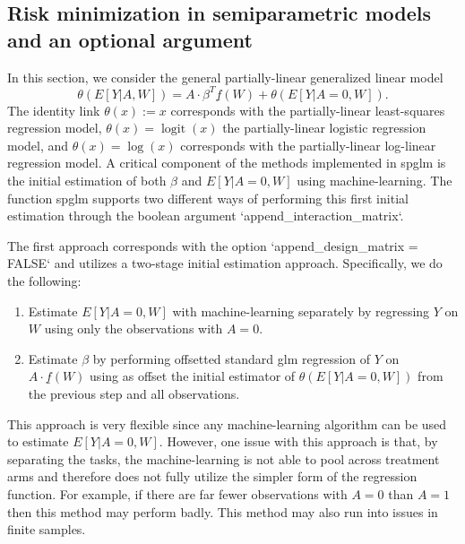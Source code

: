 \documentclass[article]{jss}
\DeclareMathOperator{\logit}{logit}
\begin{document}
\subsection{Risk minimization in semiparametric models and an optional argument }
In this section, we consider the general partially-linear generalized linear model
$$\theta(E[Y|A,W]) = A \cdot \beta^T \underline{f}(W) + \theta(E[Y|A=0,W]).$$
The identity link $\theta(x) := x$ corresponds with the partially-linear least-squares regression model, $\theta(x) = \logit(x)$ the partially-linear logistic regression model, and $\theta(x) = \log(x)$ corresponds with the partially-linear log-linear regression model. A critical component of the methods implemented in spglm is the initial estimation of both $\beta$ and $E[Y|A=0,W]$ using machine-learning. The function spglm supports two different ways of performing this first initial estimation through the boolean argument `append\_interaction\_matrix`.

The first approach corresponds with the option `append\_design\_matrix = FALSE` and utilizes a two-stage initial estimation approach. Specifically, we do the following:
\begin{enumerate}
\item Estimate $E[Y|A=0,W]$ with machine-learning separately by regressing $Y$ on $W$ using only the observations with $A=0$.
\item Estimate $\beta$ by performing offsetted standard glm regression of $Y$ on $A \cdot \underline{f}(W)$ using as offset the initial estimator of $\theta(E[Y|A=0,W])$ from the previous step and all observations.
\end{enumerate}
This approach is very flexible since any machine-learning algorithm can be used to estimate $E[Y|A=0,W]$. However, one issue with this approach is that, by separating the tasks, the machine-learning is not able to pool across treatment arms and therefore does not fully utilize the simpler form of the regression function. For example, if there are far fewer observations with $A=0$ than $A=1$ then this method may perform badly. This method may also run into issues in finite samples.
\end{document}
